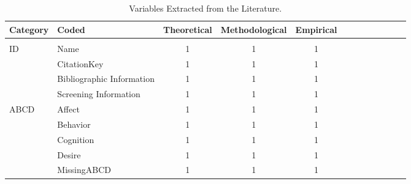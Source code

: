 \begin{table}%
\caption{Variables Extracted from the Literature.}
\label{tab:VarExtraction} 
\begin{tabular}{@{}llccc@{}}
\hline 
Category & Coded & Theoretical & Methodological & Empirical \\ 
\hline \\ [-0.5em]
        ID & Name & 1 & 1 & 1  & ~ & ~ & ~ & ~ & ~ \\ 
        ~ & CitationKey & 1 & 1 & 1  & ~ & ~ & ~ & ~ & ~ \\ 
        ~ & Bibliographic Information & 1 & 1 & 1  & ~ & ~ & ~ & ~ & ~ \\ 
        ~ & Screening Information & 1 & 1 & 1  & ~ & ~ & ~ & ~ & ~ \\ 
        ABCD & Affect & 1 & 1 & 1  & ~ & ~ & ~ & ~ & ~ \\ 
        ~ & Behavior & 1 & 1 & 1  & ~ & ~ & ~ & ~ & ~ \\ 
        ~ & Cognition & 1 & 1 & 1  & ~ & ~ & ~ & ~ & ~ \\ 
        ~ & Desire & 1 & 1 & 1  & ~ & ~ & ~ & ~ & ~ \\ 
        ~ & MissingABCD & 1 & 1 & 1  & ~ & ~ & ~ & ~ & ~ \\ 
\hline
\end{tabular}
\end{table}
